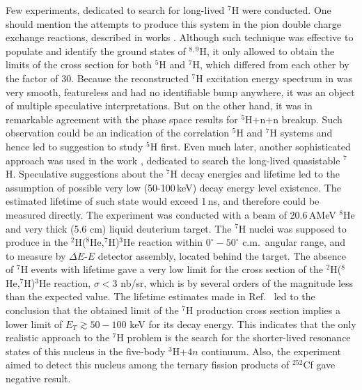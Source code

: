 Few experiments, dedicated to search for long-lived $^{7}$H were conducted.
One should mention the attempts to produce this system in the pion double charge exchange reactions, described in works \cite{Seth:1981,Evseev:1981}.
Although such technique was effective to populate and identify the ground states of $^{8,9}$H, it only allowed to obtain the limits of the cross section for both $^{5}$H and $^{7}$H, which differed from each other by the factor of 30.
Because the reconstructed $^{7}$H excitation energy spectrum in \cite{Seth:1981} was very smooth, featureless and had no identifiable bump anywhere, it was an object of multiple speculative interpretations.
But on the other hand, it was in remarkable agreement with the phase space results for $^{5}$H+n+n breakup.
Such observation could be an indication of the correlation $^{5}$H and $^{7}$H systems and hence led to suggestion to study $^{5}$H first.
Even much later, another sophisticated approach was used in the work \cite{Golovkov:2004}, dedicated to search the long-lived quasistable $^{7}$H.
Speculative suggestions about the $^{7}$H decay energies and lifetime led to the assumption of possible very low (50-100\,keV) decay energy level existence.
The estimated lifetime of such state would exceed 1\,ns, and therefore could be measured directly.
The experiment was conducted with a beam of 20.6\,AMeV $^{8}$He and very thick (5.6 cm) liquid deuterium target.
The $^{7}$H nuclei was supposed to produce in the $^2$H($^8$He,$^7$H)$^3$He reaction within $0^{\circ}-50^{\circ}$ c.m.\ angular range, and to measure by $\Delta E$-$E$ detector assembly, located behind the target. 
The absence of $^7$H events with lifetime gave a very low limit for the cross section of the $^2$H($^8$He,$^7$H)$^3$He reaction, $\sigma < 3$ nb/sr, which is by several orders of the magnitude less than the expected value.
The lifetime estimates made in Ref.\ \cite{Golovkov:2004} led to the conclusion that the obtained limit of the $^{7}$H production cross section implies a lower limit of $E_T \gtrsim 50-100$ keV for its decay energy.
This indicates that the only realistic approach to the $^7$H problem is the search for the shorter-lived resonance states of this nucleus in the five-body $^{3}$H+$4n$ continuum.
Also, the experiment \cite{Aleksandrov:1982} aimed to detect this nucleus among the ternary fission products of $^{252}$Cf gave negative result.

